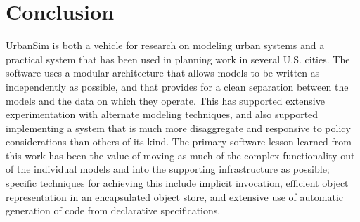 
\section{Conclusion}
\label{sec:Conclusion}

UrbanSim is both a vehicle for research on modeling urban systems and a
practical system that has been used in planning work in several
U.S. cities.  The software uses a modular architecture that allows models
to be written as independently as possible, and that provides for a clean
separation between the models and the data on which they operate.  This has
supported extensive experimentation with alternate modeling techniques, and
also supported implementing a system that is much more disaggregate and
responsive to policy considerations than others of its kind.  The primary
software lesson learned from this work has been the value of moving as much
of the complex functionality out of the individual models and into the
supporting infrastructure as possible; specific techniques for achieving
this include implicit invocation, efficient object representation in an
encapsulated object store, and extensive use of automatic generation of
code from declarative specifications.

